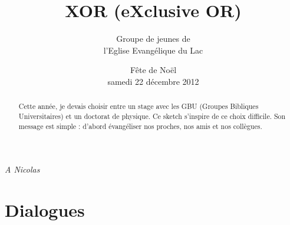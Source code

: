 \documentclass[12pt]{article}
\title{XOR (eXclusive OR)}
\author{Groupe de jeunes de \\ l'Eglise Evangélique du Lac}
\date{Fête de Noël \\ samedi 22 décembre 2012}
\begin{document}
\maketitle

\newpage

\begin{center}
\textit{A Nicolas}
\end{center}

\newpage

\begin{abstract}
Cette année, je devais choisir entre un stage avec les GBU
(Groupes Bibliques Universitaires) et un doctorat de physique.
Ce sketch s'inspire de ce choix difficile.
Son message est simple : d'abord évangéliser nos proches,
nos amis et nos collègues.
\end{abstract}

\setcounter{tocdepth}{2}
\tableofcontents

\newpage



\newpage

\section{Dialogues}

	
	
	
	

\end{document}
